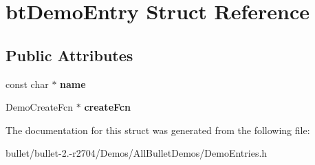 \hypertarget{structbt_demo_entry}{\section{bt\+Demo\+Entry Struct Reference}
\label{structbt_demo_entry}
}
\subsection*{Public Attributes}
\begin{DoxyCompactItemize}
\item 
\hypertarget{structbt_demo_entry_ad44b1a73369c9b002f87389b21221700}{const char $\ast$ {\bfseries name}}\label{structbt_demo_entry_ad44b1a73369c9b002f87389b21221700}

\item 
\hypertarget{structbt_demo_entry_a13059241da735b94e42c2cfed8d2744b}{Demo\+Create\+Fcn $\ast$ {\bfseries create\+Fcn}}\label{structbt_demo_entry_a13059241da735b94e42c2cfed8d2744b}

\end{DoxyCompactItemize}


The documentation for this struct was generated from the following file\+:\begin{DoxyCompactItemize}
\item 
bullet/bullet-\/2.-\/r2704/\+Demos/\+All\+Bullet\+Demos/Demo\+Entries.\+h\end{DoxyCompactItemize}
